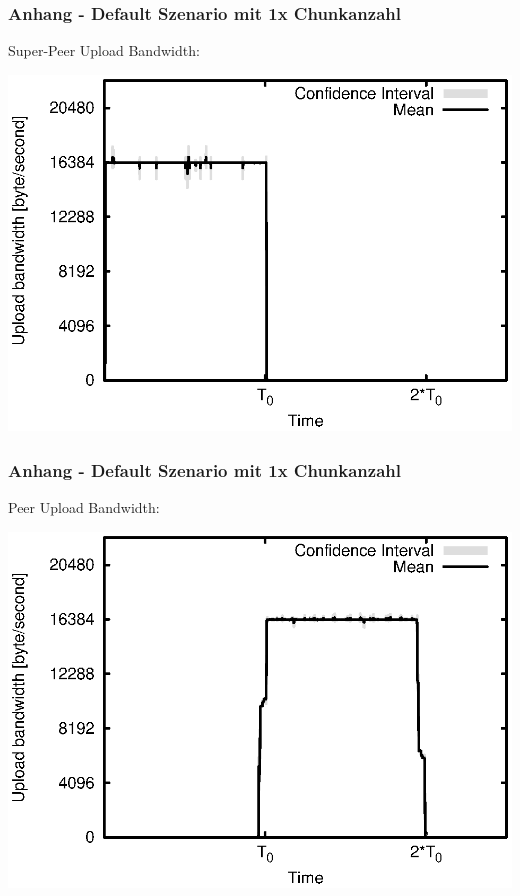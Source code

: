 \begin{frame}
  \frametitle{Anhang - Default Szenario mit 1x Chunkanzahl}
  Super-Peer Upload Bandwidth:
  
  \begin{center}
    \includegraphics[width=1\textwidth]{fig/plots/scenario_7_chunk_count_fac_1/plots/GeneratedMeanCurrentSuperSeederUploadBandwidth.csv.eps}
  \end{center}
\end{frame}


\begin{frame}
  \frametitle{Anhang - Default Szenario mit 1x Chunkanzahl}
  Peer Upload Bandwidth:
  
  \begin{center}
    \includegraphics[width=1\textwidth]{fig/plots/scenario_7_chunk_count_fac_1/plots/GeneratedMeanCurrentUploadBandwidth.csv.eps}
  \end{center}
\end{frame}


